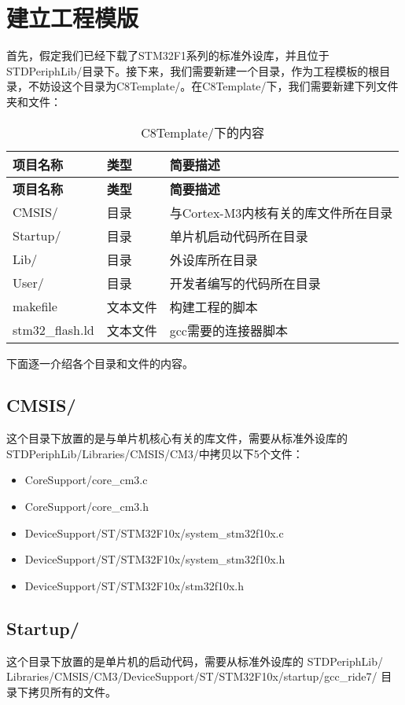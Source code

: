 \section{建立工程模版}
首先，假定我们已经下载了STM32F1系列的标准外设库，并且位于STDPeriphLib/目录下。接下来，我们需要新建一个目录，作为工程模板的根目录，不妨设这个目录为C8Template/。在C8Template/下，我们需要新建下列文件夹和文件：
\begin{center}
	\begin{longtable}[l]{| p{30mm} | p{30mm} | p{80mm} |}
		\caption{C8Template/下的内容}\\
		\hline 
		\rowcolor{Gray}
		\textbf{项目名称} & \textbf{类型} & \textbf{简要描述} \\
		\hline
		\endfirsthead
		
		\hline 
		\rowcolor{Gray}
		\textbf{项目名称} & \textbf{类型} & \textbf{简要描述} \\
		\hline
		\endhead
		
		CMSIS/ &  目录 & 与Cortex-M3内核有关的库文件所在目录 \\ 
		Startup/ & 目录 & 单片机启动代码所在目录 \\
		Lib/ & 目录 & 外设库所在目录 \\
		User/ & 目录 & 开发者编写的代码所在目录 \\
		makefile & 文本文件 & 构建工程的脚本 \\
		stm32\_flash.ld & 文本文件 & gcc需要的连接器脚本 \\
		\hline
	\end{longtable}
\end{center}
\par 
下面逐一介绍各个目录和文件的内容。
\subsection{CMSIS/}
这个目录下放置的是与单片机核心有关的库文件，需要从标准外设库的\\STDPeriphLib/Libraries/CMSIS/CM3/中拷贝以下5个文件：
\begin{itemize}
	\item CoreSupport/core\_cm3.c
	\item CoreSupport/core\_cm3.h
	\item DeviceSupport/ST/STM32F10x/system\_stm32f10x.c
	\item DeviceSupport/ST/STM32F10x/system\_stm32f10x.h
	\item DeviceSupport/ST/STM32F10x/stm32f10x.h
\end{itemize}
\subsection{Startup/}
这个目录下放置的是单片机的启动代码，需要从标准外设库的
STDPeriphLib/\\Libraries/CMSIS/CM3/DeviceSupport/ST/STM32F10x/startup/gcc\_ride7/
目录下拷贝所有的文件。
